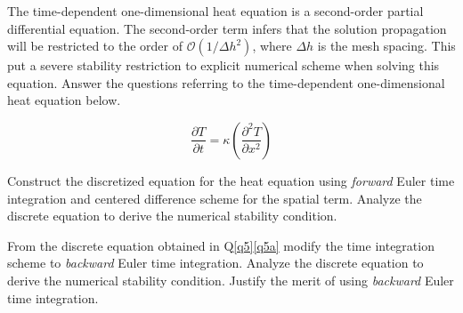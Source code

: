 \question{} \label{q5}

	The time-dependent one-dimensional heat equation is a second-order partial differential equation. The second-order term infers that the solution propagation will be restricted to the order of $\mathcal{O}(1/\Delta h^{2})$, where $\Delta h$ is the mesh spacing. This put a severe stability restriction to explicit numerical scheme when solving this equation. Answer the questions referring to the time-dependent one-dimensional heat equation below.
	

\begin{equation}
\frac{\partial T}{\partial t} = \kappa \left( \frac{\partial^2 T}{\partial x^2} \right) \nonumber
\end{equation}		
		
		\listbeginx

\item \label{q5a} Construct the discretized equation for the heat equation using \textit{forward} Euler time integration and centered difference scheme for the spatial term. Analyze the discrete equation to derive the numerical stability condition.

		

\item \label{q5b} From the discrete equation obtained in Q\ref{q5}\ref{q5a} modify  the time integration scheme to \textit{backward} Euler time integration. Analyze the discrete equation to derive the numerical stability condition. Justify the merit of using \textit{backward} Euler time integration.     



